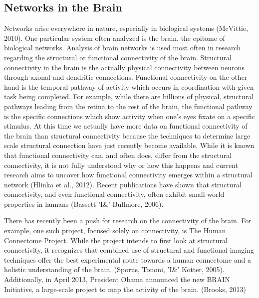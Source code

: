 \documentclass[11pt,letterpaper,doublespacing,titlepage]{article}
\begin{document}
\subsection{Networks in the Brain}
\par
Networks arise everywhere in nature, especially in biological systems (McVittie, 2010). One particular system often analyzed is the brain, the epitome of biological networks. Analysis of brain networks is used most often in research regarding the structural or functional connectivity of the brain. Structural connectivity in the brain is the actually physical connectivity between neurons through axonal and dendritic connections. Functional connectivity on the other hand is the temporal pathway of activity which occurs in coordination with given task being completed. For example, while there are billions of physical, structural pathways leading from the retina to the rest of the brain, the functional pathway is the specific connections which show activity when one's eyes fixate on a specific stimulus. At this time we actually have more data on functional connectivity of the brain than structural connectivity because the techniques to determine large scale structural connection have just recently become available. While it is known that functional connectivity can, and often does, differ from the structural connectivity, it is not fully understood why or how this happens and current research aims to uncover how functional connectivity emerges within a structural network (Hlinka et al., 2012). Recent publications have shown that structural connectivity, and even functional connectivity, often exhibit small-world properties in humans (Bassett 'I\&' Bullmore, 2006).
\par
There has recently been a push for research on the connectivity of the brain. For example, one such project, focused solely on connectivity, is The Human Connectome Project. While the project intends to first look at structural connectivity, it recognizes that combined use of structural and functional imaging techniques offer the best experimental route towards a human connectome and a holistic understanding of the brain. (Sporns, Tononi, 'I\&' Kotter, 2005). Additionally, in April 2013, President Obama announced the new BRAIN Initiative, a large-scale project to map the activity of the brain. (Brooks, 2013)
\end{document}

